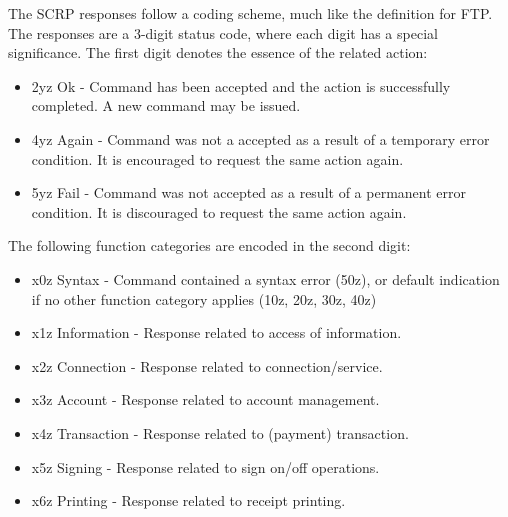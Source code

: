 The SCRP responses follow a coding scheme, much like the definition for FTP. The responses are a 3-digit status code, where each digit has a special significance. The first digit denotes the essence of the related action:
\begin{itemize}
\item 2yz Ok - Command has been accepted and the action is successfully completed. A new command may be issued.
\item 4yz Again - Command was not a accepted as a result of a temporary error condition. It is encouraged to request the same action again.
\item 5yz Fail - Command was not accepted as a result of a permanent error condition. It is discouraged to request the same action again.
\end{itemize}

The following function categories are encoded in the second digit:
\begin{itemize}
\item x0z Syntax - Command contained a syntax error (50z), or default indication if no other function category applies (10z, 20z, 30z, 40z)
\item x1z Information - Response related to access of information.
\item x2z Connection - Response related to connection/service.
\item x3z Account - Response related to account management.
\item x4z Transaction - Response related to (payment) transaction.
\item x5z Signing - Response related to sign on/off operations.
\item x6z Printing - Response related to receipt printing.
\end{itemize}

